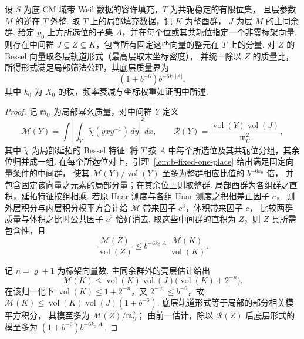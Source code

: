 \begin{lemma}[固定标架向量的有限位筛法数据]
\label{lem:b-finite-sieve}
\emitthmsource
设 $S$ 为底 CM 域带 Weil 数据的容许填充，$T$ 为共轭稳定的有限位集，
且层参数 $M$ 的逆在 $T$ 外整. 取 $T$ 上的局部填充数据，记 $K$ 为整酉群，
$J$ 为层 $M$ 的主同余群.
给定 $p_0$ 上方所选位的子集 $A$，并在每个位或其共轭位指定一个非零标架向量.
则存在中间群 $J\subseteq Z\subseteq K$，包含所有固定这些向量的整元在 $T$ 上的分量.
对 $Z$ 的 Bessel 向量取各层轨道形式（最高层取末坐标密度），
并统一除以 $Z$ 的质量比，所得形式满足局部筛法公理，其底层质量界为
\[
 (1+b^{-6})b^{-6k_0|A|},
\]
其中 $k_0$ 为 $X_0$ 的秩，频率衰减与坐标权重如证明中所述.
\end{lemma}
\begin{proof}
记 $\mathfrak m_U$ 为局部幂幺质量，对中间群 $Y$ 定义
\[
 \mathcal M(Y)=\int\left|\int_Y\widetilde\chi(yxy^{-1})\,dy\right|^2dx,
 \qquad
 \mathcal R(Y)=\frac{\operatorname{vol}(Y)\operatorname{vol}(J)}
                       {\mathfrak m_U^2},
\]
其中 $\widetilde\chi$ 为局部延拓的 Bessel 特征.
将 $T$ 按 $A$ 中每个所选位及其共轭位分组，其余位归并成一组.
在每个所选位对上，引理~\ref{lem:b-fixed-one-place} 给出满足固定向量条件的中间群，
使其 $\mathcal M(Y)/\operatorname{vol}(Y)$ 至多为整群相应比值的 $b^{-6k_0}$ 倍，
并包含固定该向量之元素的局部分量；在其余位上则取整群.
局部酉群为各组群之直积，延拓特征按组相乘.
若原 Haar 测度与各组 Haar 测度之积相差正因子 $c$，
则外层积分与内层积分模平方合计给 $\mathcal M$ 带来因子 $c^3$，体积带来因子 $c$，
比较两群质量与体积之比时公共因子 $c^2$ 恰好消去.
取这些中间群的直积为 $Z$，则 $Z$ 具所需包含性，且
\[
 \frac{\mathcal M(Z)}{\operatorname{vol}(Z)}
 \le b^{-6k_0|A|}\frac{\mathcal M(K)}{\operatorname{vol}(K)} .
\]

记 $n=\varrho+1$ 为标架向量数. 主同余群外的壳层估计给出
\[
 \mathcal M(K)\le\operatorname{vol}(K)\operatorname{vol}(J)
 \bigl(\operatorname{vol}(K)+2^{-n}\bigr).
\]
在该归一化下 $\operatorname{vol}(K)\le1+2^{-n}$，又
$2^{-\varrho}\le b^{-6}$，故
$\mathcal M(K)\le\operatorname{vol}(K)\operatorname{vol}(J)(1+b^{-6})$.
底层轨道形式等于局部的部分相关模平方积分，
其模至多为 $\mathcal M(Z)/\mathfrak m_U^2$；
由前一估计，除以 $\mathcal R(Z)$ 后底层形式的模至多为
$(1+b^{-6})b^{-6k_0|A|}$.


\end{proof}
